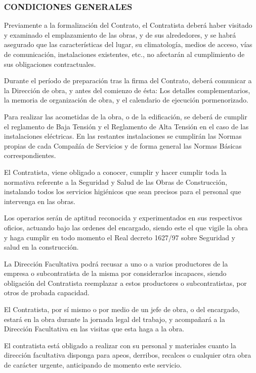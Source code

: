 \documentclass{article}
\begin{document}
{\subsubsection{CONDICIONES GENERALES}

Previamente a la formalización del Contrato, el Contratista deberá   haber visitado y examinado el emplazamiento de las obras, y de sus  alrededores, y se habrá  asegurado que las características del lugar, su  climatología, medios de acceso, vías de comunicación, instalaciones  existentes, etc., no afectarán al cumplimiento de sus obligaciones  contractuales.  

Durante el período de preparación tras la firma del Contrato, deberá   comunicar a la Dirección de obra, y antes del comienzo de ésta: Los detalles  complementarios, la memoria de organización de obra, y el calendario de  ejecución pormenorizado.  

Para realizar las acometidas de la obra, o de la edificación, se deberá  de cumplir el reglamento de Baja Tensión y el Reglamento de Alta Tensión en  el caso de las instalaciones eléctricas. En las restantes instalaciones se cumplirán las Normas propias de cada Compañía de Servicios y de forma general las Normas Básicas correspondientes.

El Contratista, viene obligado a conocer, cumplir y hacer cumplir toda la normativa referente a la Seguridad y Salud de las Obras de Construcción,  instalando  todos los servicios higiénicos que sean precisos para el personal que intervenga en las obras.

Los operarios serán de aptitud reconocida y experimentados en sus respectivos oficios, actuando bajo las ordenes del encargado, siendo este el que vigile la obra y haga cumplir en todo momento el Real decreto 1627/97 sobre Seguridad y salud en la construcción.

La Dirección Facultativa podrá recusar a uno o a varios productores de la empresa o subcontratista de la misma por considerarlos incapaces, siendo obligación del Contratista reemplazar a estos productores o subcontratistas, por otros de probada capacidad.

El Contratista, por sí mismo o por medio de un jefe de obra, o del encargado, estará en la obra durante la jornada legal del trabajo, y acompañará a la Dirección Facultativa en las visitas que esta haga a la obra.

El contratista está obligado a realizar con su personal y materiales cuanto la dirección facultativa disponga para apeos, derribos, recalces o cualquier otra obra de carácter urgente, anticipando de momento este servicio.

}
\end{document}
